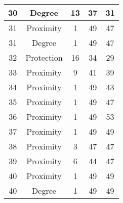 \documentclass[results.tex]{subfiles}
\begin{document}
\begin{center}
\begin{tabular}{| c || c | c | c | c |}
            \hline
            30                      & Degree                       & 13                     & 37                      & 31                   \\
            \hline
            31                      & Proximity                    & 1                      & 49                      & 47                   \\
            \hline
            31                      & Degree                       & 1                      & 49                      & 47                   \\
            \hline
            32                      & Protection                   & 16                     & 34                      & 29                   \\
            \hline
            33                      & Proximity                    & 9                      & 41                      & 39                   \\
            \hline
            34                      & Proximity                    & 1                      & 49                      & 43                   \\
            \hline
            35                      & Proximity                    & 1                      & 49                      & 47                   \\
            \hline
            36                      & Proximity                    & 1                      & 49                      & 53                   \\
            \hline
            37                      & Proximity                    & 1                      & 49                      & 49                   \\
            \hline
            38                      & Proximity                    & 3                      & 47                      & 47                   \\
            \hline
            39                      & Proximity                    & 6                      & 44                      & 47                   \\
            \hline
            40                      & Proximity                    & 1                      & 49                      & 49                   \\
            \hline
            40                      & Degree                       & 1                      & 49                      & 49                   \\

\end{tabular}
\end{center}
\end{document}
